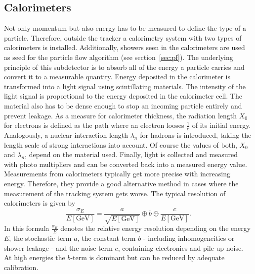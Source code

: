 \subsection{Calorimeters}
	Not only momentum but also energy has to be measured to define the type of a particle. Therefore, outside the tracker a calorimetry system with two types of calorimeters is installed. Additionally, showers seen in the calorimeters are used as seed for the particle flow algorithm (see section~\ref{sec:pf}). The underlying principle of this subdetector is to absorb all of the energy a particle carries and convert it to a measurable quantity. Energy deposited in the calorimeter is transformed into a light signal using scintillating materials. The intensity of the light signal is proportional to the energy deposited in the calorimeter cell. The material also has to be dense enough to stop an incoming particle entirely and prevent leakage. As a measure for calorimeter thickness, the radiation length $X_0$ for electrons is defined as the path where an electron looses $\frac{1}{e}$ of its initial energy. Analogously, a nuclear interaction length $\lambda_n$ for hadrons is introduced, taking the length scale of strong interactions into account. Of course the values of both, $X_0$ and $\lambda_n$, depend on the material used. Finally, light is collected and measured with photo multipliers and can be converted back into a measured energy value. Measurements from calorimeters typically get more precise with increasing energy. Therefore, they provide a good alternative method in cases where the measurement of the tracking system gets worse. The typical resolution of calorimeters is given by
	\begin{equation}
	\frac{\sigma_E}{E\left[\text{GeV}\right]} = \frac{a}{\sqrt{E\left[\text{GeV}\right]}} \oplus b \oplus \frac{c}{E\left[\text{GeV}\right]}.
	\label{eq:calo}
	\end{equation}
	In this formula $\frac{\sigma_E}{E}$ denotes the relative energy resolution depending on the energy $E$, the stochastic term $a$, the constant term $b$ - including inhomogeneities or shower leakage - and the noise term $c$, containing electronics and pile-up noise. At high energies the $b$-term is dominant but can be reduced by adequate calibration. 
